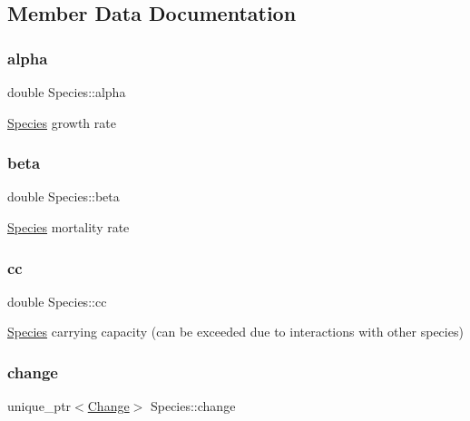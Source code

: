 \subsection{Member Data Documentation}
\hypertarget{classSpecies_a28a22a5a1eef97867bd6e5d7db2c0c6a}{}\label{classSpecies_a28a22a5a1eef97867bd6e5d7db2c0c6a} 
\subsubsection{\texorpdfstring{alpha}{alpha}}
{\footnotesize\ttfamily double Species\+::alpha\hspace{0.3cm}{\ttfamily [protected]}}

\hyperlink{classSpecies}{Species} growth rate \hypertarget{classSpecies_ae4f30dc0bf280e80601fc39a0150f8f2}{}\label{classSpecies_ae4f30dc0bf280e80601fc39a0150f8f2} 
\subsubsection{\texorpdfstring{beta}{beta}}
{\footnotesize\ttfamily double Species\+::beta\hspace{0.3cm}{\ttfamily [protected]}}

\hyperlink{classSpecies}{Species} mortality rate \hypertarget{classSpecies_afbf0d05fd5e3904c1ce62833942ef935}{}\label{classSpecies_afbf0d05fd5e3904c1ce62833942ef935} 
\subsubsection{\texorpdfstring{cc}{cc}}
{\footnotesize\ttfamily double Species\+::cc\hspace{0.3cm}{\ttfamily [protected]}}

\hyperlink{classSpecies}{Species} carrying capacity (can be exceeded due to interactions with other species) \hypertarget{classSpecies_a6517dbf3b05112b50baadc9479856dda}{}\label{classSpecies_a6517dbf3b05112b50baadc9479856dda} 
\subsubsection{\texorpdfstring{change}{change}}
{\footnotesize\ttfamily unique\+\_\+ptr$<$\hyperlink{classChange}{Change}$>$ Species\+::change\hspace{0.3cm}{\ttfamily [protected]}}

